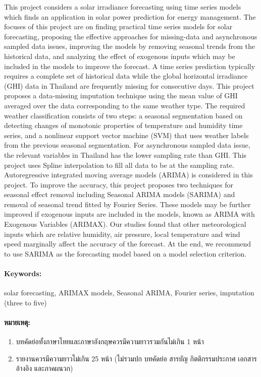 \documentclass[11pt,a4paper]{article}
\begin{document}
This project considers a solar irradiance forecasting using time series models which finds an application in solar power prediction for energy management. The focuses of this project are on finding practical time series models for solar forecasting, proposing the effective approaches for missing-data and asynchronous sampled data issues, improving the models by removing seasonal trends from the historical data, and analyzing the effect of exogenous inputs which may be included in the models to improve the forecast. A time series prediction typically requires a complete set of historical data while the global horizontal irradiance (GHI) data in Thailand are frequently missing for consecutive days. This project proposes a data-missing imputation technique using the mean value of GHI averaged over the data corresponding to the same weather type. The required weather classification consists of two steps: a seasonal segmentation based on detecting changes of monotonic properties of temperature and humidity time series, and a nonlinear support vector machine (SVM) that uses weather labels from the previous seasonal segmentation. For asynchronous sampled data issue, the relevant variables in Thailand has the lower sampling rate than GHI. This project uses Spline interpolation to fill all data to be at the sampling rate. Autoregressive integrated moving average models (ARIMA) is considered in this project. To improve the accuracy, this project proposes two techniques for seasonal effect removal including Seasonal ARIMA models (SARIMA) and removal of seasonal trend fitted by Fourier Series. These models may be further improved if exogenous inputs are included in the models, known as ARIMA with Exogenous Variables (ARIMAX). Our studies found that other meteorological inputs which are relative humidity, air pressure, local temperature and wind speed marginally affect the accuracy of the forecast. At the end, we recommend to use SARIMA as the forecasting model based on a model selection criterion.

\paragraph{\textbf Keywords:} solar forecasting, ARIMAX models, Seasonal ARIMA, Fourier series, imputation (three to five)

\paragraph{\textbf หมายเหตุ:}
\begin{enumerate}
\item บทคัดย่อทั้งภาษาไทยและภาษาอังกฤษควรมีความยาวรวมกันไม่เกิน 1 หน้า
\item รายงานควรมีความยาวไม่เกิน 25 หน้า (ไม่รวมปก บทคัดย่อ สารบัญ กิตติกรรมประกาศ เอกสารอ้างอิง และภาคผนวก)
\end{enumerate}
\end{document}
